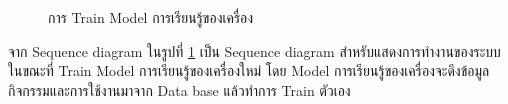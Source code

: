 \documentclass[14pt,oneside,openright,a4paper]{cpe-thai-project}
\begin{document}
  \begin{figure}[!h]\centering
    \setlength{\fboxrule}{0.5mm} %
    \setlength{\fboxsep}{0.5cm}
    \caption{การ Train Model การเรียนรู้ของเครื่อง}\label{fig:Machine learning training}
  \end{figure}

  จาก Sequence diagram ในรูปที่ \ref{fig:Machine learning training} เป็น Sequence diagram สำหรับแสดงการทำงานของระบบในขณะที่ Train Model การเรียนรู้ของเครื่องใหม่ โดย Model การเรียนรู้ของเครื่องจะดึงข้อมูลกิจกรรมและการใช้งานมาจาก Data base แล้วทำการ Train ตัวเอง

\newpage
\end{document}
